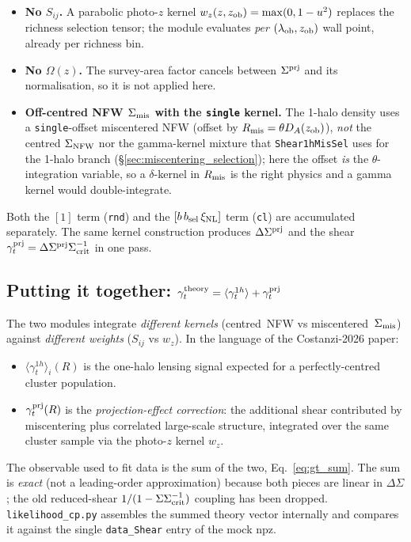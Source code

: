 \documentclass[a4paper, 11pt]{article}
\newcommand{\modname}[1]{\textcolor{kwcol}{\texttt{#1}}}
\begin{document}
\begin{itemize}
  \setlength\itemsep{2pt}
  \item \textbf{No $S_{ij}$.}  A parabolic photo-$z$ kernel
    $w_z(z, z_{\rm ob}) = \max(0, 1 - u^2)$ replaces the richness
    selection tensor; the module evaluates \emph{per}
    $(\lambda_{\rm ob}, z_{\rm ob})$ wall point, already per
    richness bin.
  \item \textbf{No $\Omega(z)$.}  The survey-area factor cancels between
    $\Sigma^{\rm prj}$ and its normalisation, so it is not applied
    here.
  \item \textbf{Off-centred NFW $\Sigma_{\rm mis}$ with the
    \texttt{single} kernel.}  The 1-halo density uses a
    \texttt{single}-offset miscentered NFW (offset by
    $R_{\rm mis} = \theta D_A(z_{\rm ob})$), \emph{not} the centred
    $\Sigma_{\rm NFW}$ nor the gamma-kernel mixture that
    \modname{Shear1hMisSel} uses for the 1-halo branch
    (\S\ref{sec:miscentering_selection}); here the offset
    \emph{is} the $\theta$-integration variable, so a $\delta$-kernel
    in $R_{\rm mis}$ is the right physics and a gamma kernel would
    double-integrate.
\end{itemize}

Both the $[1]$ term (\texttt{rnd}) and the $[b\,b_{\rm sel}\,\xi_{\rm NL}]$
term (\texttt{cl}) are accumulated separately.  The same kernel
construction produces $\Delta\Sigma^{\rm prj}$ and the shear
$\gamma_t^{\rm prj} = \Delta\Sigma^{\rm prj} \Sigma_{\rm crit}^{-1}$
in one pass.

\subsection{Putting it together: $\gamma_t^{\rm theory} = \langle\gamma_t^{1h}\rangle + \gamma_t^{\rm prj}$}

The two modules integrate \emph{different kernels}
(\mbox{centred NFW} vs \mbox{miscentered $\Sigma_{\rm mis}$}) against
\emph{different weights} ($S_{ij}$ vs $w_z$).  In the language of the
Costanzi-2026 paper:
\begin{itemize}
  \setlength\itemsep{1pt}
  \item $\langle\gamma_t^{1h}\rangle_i(R)$ is the one-halo lensing
    signal expected for a perfectly-centred cluster population.
  \item $\gamma_t^{\rm prj}(R)$ is the \emph{projection-effect
    correction}: the additional shear contributed by miscentering
    plus correlated large-scale structure, integrated over the same
    cluster sample via the photo-$z$ kernel $w_z$.
\end{itemize}
The observable used to fit data is the sum of the two,
Eq.~\eqref{eq:gt_sum}.  The sum is \emph{exact} (not a leading-order
approximation) because both pieces are linear in $\Delta\Sigma$; the
old reduced-shear $1/(1-\Sigma\Sigma_{\rm crit}^{-1})$ coupling has
been dropped.  \modname{likelihood\_cp.py} assembles the summed
theory vector internally and compares it against the single
\texttt{data\_Shear} entry of the mock npz.
\end{document}
